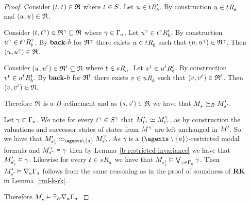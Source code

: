 \begin{proof}
Consider $(\kStateT, \kStateT) \in \refinement$ where $\kStateT \in \kStates$.
Let $\kStateU \in \kSuccessorsPB{\kStateT}$.
By construction $\kStateU \in \kSuccessorsB{\kStateT}$ and $(\kStateU, \kStateU) \in \refinement$.

Consider $(\kStateT, \kStateT[\gamma]) \in \refinement^\gamma \subseteq \refinement$ where $\gamma \in \Gamma_\agentA$.
Let $\kStateU[\gamma] \in \kSuccessorsPB{\kStateT[\gamma]}$.
By construction $\kStateU[\gamma] \in \kSuccessorsB[\gamma]{\kStateT[\gamma]}$.
By {\bf back-$\agentB$} for $\refinement^\gamma$ there exists $\kStateU \in \kSuccessorsB{\kStateT}$ such that $(\kStateU, \kStateU[\gamma]) \in \refinement^\gamma$.
Then $(\kStateU, \kStateU[\gamma]) \in \refinement$.

Consider $(\kStateU, \kStateU[\kStateT]) \in \refinement^{\kStateT} \subseteq \refinement$ where $\kStateT \in \kSuccessorsA{\kStateS}$.
Let $\kStateV[\kStateT] \in \kSuccessorsPB{\kStateU[\kStateT]}$.
By construction $\kStateV[\kStateT] \in \kSuccessorsB[\kStateT]{\kStateU[\kStateT]}$.
By {\bf back-$\agentB$} for $\refinement^{\kStateT}$ there exists $\kStateV \in \kSuccessorsB{\kStateU}$ such that $(\kStateV, \kStateV[\kStateT]) \in \refinement^{\kStateT}$.
Then $(\kStateV, \kStateV[\kStateT]) \in \refinement$.

Therefore $\refinement$ is a $\agentsB$-refinement and as $(\kStateS, \kStateSP) \in \refinement$ we have that $\kPModel{\kStateS} \simulatesBs \kPModelP{\kStateSP}$.

Let $\gamma \in \Gamma_\agentA$.
We note for every $\kStateT[\gamma] \in \kStates[\gamma]$ that $\kPModelP{\kStateT[\gamma]} \bisimilar \kPModel[\gamma]{\kStateT[\gamma]}$, as by construction the valuations and successor states of states from $\kModel[\gamma]$ are left unchanged in $\kModelP$.
So we have that $\kPModelP{\kStateSP_\gamma} \bisimilar[\agents \setminus \{\agentA\}] \kPModel[\gamma]{\kStateS[\gamma]}$.
As $\gamma$ is a $(\agents \setminus \{\agentA\})$-restricted modal formula and $\kPModel[\gamma]{\kStateS[\gamma]} \entails \gamma$ then by Lemma~\ref{b-restricted-invariance} we have that $\kPModelP{\kStateSP_\gamma} \entails \gamma$.
Likewise for every $\kStateT \in \kSuccessorsA{\kStateS}$ we have that $\kPModel{\kStateSP_{\kStateT}} \entails \bigvee_{\gamma \in \Gamma_\agentA} \gamma$.
Then $\kPModelP{\kStateSP} \entails \coversA \Gamma_\agentA$ follows from the same reasoning as in the proof of soundness of {\bf RK} in Lemma~\ref{rml-k-rk}.

Therefore $\kPModel{\kStateS} \entails \somerefsBs \coversA \Gamma_\agentA$.
\end{proof}


